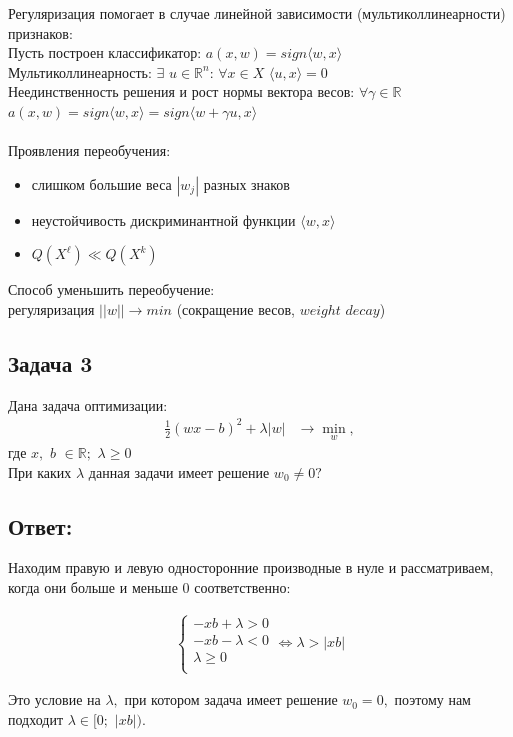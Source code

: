 Регуляризация помогает в случае линейной зависимости (мультиколлинеарности) признаков:\\
Пусть построен классификатор: $a(x, w) = sign\langle w, x \rangle$ \\
Мультиколлинеарность: $\exists$  $u \in \mathbb{R}^{n}$: $\forall x \in X$ $\langle u, x \rangle = 0$ \\
Неединственность решения и рост нормы вектора весов: $\forall \gamma \in \mathbb{R}$ $a(x, w) = sign\langle w, x \rangle = sign \langle w + \gamma u, x \rangle$ \\
\\
Проявления переобучения:
\begin{itemize}
    \item слишком большие веса $|w_j|$ разных знаков
    \item неустойчивость дискриминантной функции $\langle w, x \rangle$
    \item $Q(X^{\ell}) \ll Q(X^{k})$
\end{itemize}
Способ уменьшить переобучение:\\
регуляризация $||w|| \rightarrow min$ (сокращение весов, $weight$ $decay$)

\subsection{Задача 3}

Дана задача оптимизации:
\begin{align*}
    \frac{1}{2}(wx - b)^2 + \lambda|w| & \rightarrow \min_{w},
\end{align*}
где $x,$ $b$ $\in \mathbb{R};$ $\lambda \geq 0$\\
При каких $\lambda$ данная задачи имеет решение $w_0 \neq 0?$
 
\subsection{Ответ:}

Находим правую и левую односторонние производные в нуле и рассматриваем, когда они больше и меньше 0 соответственно:

\begin{align*}
    \begin{cases}
        -xb + \lambda > 0\\
        -xb - \lambda < 0\\
        \lambda \geq 0\\
    \end{cases} \Leftrightarrow \lambda > |xb|
\end{align*}

Это условие на $\lambda,$ при котором задача имеет решение $w_0 = 0,$ поэтому нам подходит $\lambda \in [0;$ $|xb|)$.
